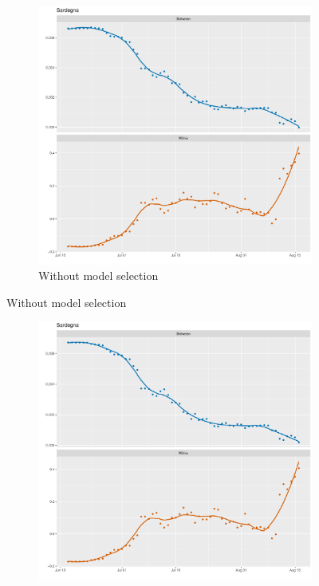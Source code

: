 \documentclass[12pt]{article}
\begin{document}
\begin{appendices}
		\begin{figure}[H]
    	    \centering
    	    \begin{subfigure}{\textwidth}
    	      \centering
    	      \includegraphics[width=0.8\linewidth]{output/model_between_lag14_betas_Isole_rolling.pdf}
    	      \caption{Without model selection}
    	      \label{fig:beta_between_over_time_isole_regular}
    	    \end{subfigure}
        \end{figure}
        \begin{figure}[H]\ContinuedFloat
    	    \begin{subfigure}{\textwidth}
    	      \centering
    	      \includegraphics[width=0.8\linewidth]{output/model_between_lag14_betas_Isole_aic_rolling.pdf}

\end{subfigure}
\end{figure}
\end{appendices}
\end{document}
